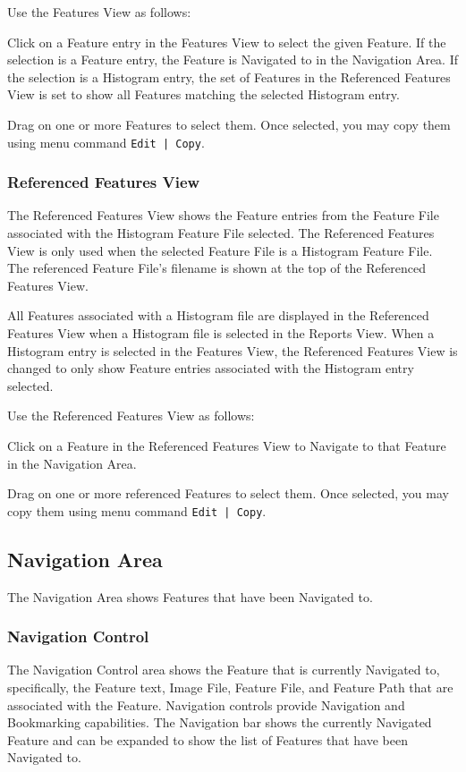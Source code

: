 \documentclass[10pt,twoside]{article}
\begin{document}
Use the Features View as follows:
\begin{compactitem}
\item Click on a Feature entry in the Features View
to select the given Feature.
If the selection is a Feature entry, the Feature is Navigated to in the Navigation Area.
If the selection is a Histogram entry,
the set of Features in the Referenced Features View is set
to show all Features matching the selected Histogram entry.
\item Drag on one or more Features to select them.
Once selected, you may copy them using menu command \texttt{Edit | Copy}.
\end{compactitem}

\subsubsection{Referenced Features View}
The Referenced Features View
shows the Feature entries from the Feature File
associated with the Histogram Feature File selected.
The Referenced Features View is only used
when the selected Feature File is a Histogram Feature File.
The referenced Feature File's filename is shown at the top of the Referenced Features View.

All Features associated with a Histogram file are displayed in the Referenced Features View
when a Histogram file is selected in the Reports View.
When a Histogram entry is selected in the Features View,
the Referenced Features View is changed to only show Feature entries
associated with the Histogram entry selected.

Use the Referenced Features View as follows:
\begin{compactitem}
\item Click on a Feature in the Referenced Features View
to \gls{Navigate} to that Feature in the Navigation Area.
\item Drag on one or more referenced Features to select them.
Once selected, you may copy them using menu command \texttt{Edit | Copy}.
\end{compactitem}

\subsection{Navigation Area}
The Navigation Area shows Features that have been Navigated to.

\subsubsection{Navigation Control}
The Navigation Control area shows the Feature that is currently Navigated to,
specifically, the Feature text, Image File, Feature File, 
and Feature Path that are associated with the Feature.
Navigation controls provide Navigation and Bookmarking capabilities.
The Navigation bar shows the currently Navigated Feature
and can be expanded to show the list of Features that have been Navigated to.
\end{document}
